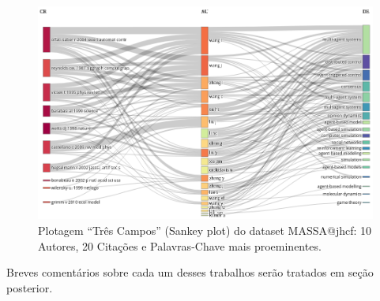 \begin{figure}
    \centering
    \includegraphics[angle=0,width=1\textwidth]{experiments/jhcf/PesqBibliogr/Computacao Experimental/WoS-20210803/classico-mais-citacoes/Dataset/ThreeFieldPlot-AU-CR-DE-20-10-20.png}
    \caption{Plotagem ``Três Campos'' (Sankey plot) do dataset MASSA@jhcf: 10 Autores, 20 Citações e Palavras-Chave mais proeminentes.}
    \label{fig:MASSA@jhcf:ThreeFieldPlot:10-20-20}
\end{figure}

Breves comentários sobre cada um desses trabalhos serão tratados em seção posterior.

